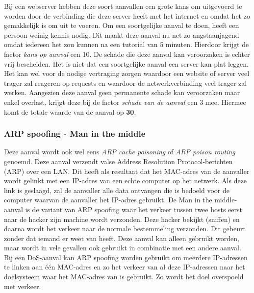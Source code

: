 \documentclass[pdftex,a4paper,12pt]{report}
\begin{document}
Bij een webserver hebben deze soort aanvallen een grote kans om uitgevoerd te worden door de verbinding die deze server heeft met het internet en omdat het zo gemakkelijk is om uit te voeren. Om een soortgelijke aanval te doen, heeft een persoon weinig kennis nodig. Dit maakt deze aanval nu net zo angstaanjagend omdat iedereen het zou kunnen na een tutorial van 5 minuten. Hierdoor krijgt de factor \textit{kans op aanval} een 10. De schade die deze aanval kan veroorzaken is echter vrij bescheiden. Het is niet dat een soortgelijke aanval een server kan plat leggen. Het kan wel voor de nodige vertraging zorgen waardoor een website of server veel trager zal reageren op requests en waardoor de netwerkverbinding veel trager zal werken. Aangezien deze aanval geen permanente schade kan veroorzaken maar enkel overlast, krijgt deze bij de factor \textit{schade van de aanval} een 3 mee. Hiermee komt de totale waarde van de aanval op \textbf{30}.

\subsubsection{ARP spoofing - Man in the middle}
Deze aanval wordt ook wel eens \textit{ARP cache poisoning} of \textit{ARP poison routing} genoemd. Deze aanval verzendt valse Address Resolution Protocol-berichten (ARP) over een LAN. Dit heeft als resultaat dat het MAC-adres van de aanvaller wordt gelinkt met een IP-adres van een echte computer op het netwerk. Als deze link is geslaagd, zal de aanvaller alle data ontvangen die is bedoeld voor de computer waarvan de aanvaller het IP-adres gebruikt. De Man in the middle-aanval is de variant van ARP spoofing waar het verkeer tussen twee hosts eerst naar de hacker zijn machine wordt verzonden. Deze hacker bekijkt (sniffen) en daarna wordt het verkeer naar de normale bestemmeling verzonden. Dit gebeurt zonder dat iemand er weet van heeft. Deze aanval kan alleen gebruikt worden, maar wordt in vele gevallen ook gebruikt in combinatie met een andere aanval. Bij een DoS-aanval kan ARP spoofing worden gebruikt om meerdere IP-adressen te linken aan één MAC-adres en zo het verkeer van al deze IP-adressen naar het doelsysteem waar het MAC-adres van is gebruikt. Zo wordt het doel overspoeld met verkeer. \citep{Glynn2014} \newline
\end{document}

